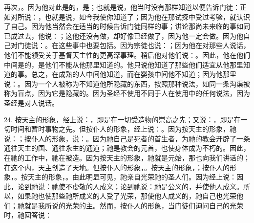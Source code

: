 再次，。因为他对此是的，是；也就是说，他当时没有那样知道以便告诉门徒：正如对所说：，也就是说，如今我使你知道了；因为他在那试探中受过考验，就认识了自己。因为他当然会在适当的时候告诉门徒同样的事；讲论那尚未来临的事如同已成过去，他说：；这他还没有做，却好像已经做了，因为他一定会做。因为他自己对门徒说：。在这些事中也要包括。因为宗徒也说：；因为他在对那些人说话，他们不能领受关于基督天主性的更高深事理。稍后他对他们说：。因此，他在他们中间是的，是他们不能从他那里知道的。他只说他知道了那些他们适宜从他那里知道的事。总之，在成熟的人中间他知道，而在婴孩中间他不知道；因为他那里说：。因为一个人被称为不知道他所隐藏的东西，按照那种说法，如同一条沟渠被称为盲点，因为它是隐藏的。因为圣经不使用不同于人在使用中的任何说法，因为圣经是对人说话。\par

24. 按天主的形象，经上说：，即是在一切受造物的崇高之先；又说：，即是在一切时间和暂时事物之先。但按仆人的形象，经上说：。因为按天主的形象，祂说：；按仆人的形象，说：。因为祂自己是死者的首生者，为祂的教会开辟了一条通往天主的国、通往永生的通道；祂是教会的元首，也使身体成为不朽的。因此，在祂的工作中，祂在被造。因为按天主的形象，祂就是元始，那也向我们讲话的；在这个内，天主创造了天地。但按仆人的形象，。按天主的形象，；按仆人的形象，。按天主的形象，。由此明显可见，祂亲自光荣祂的圣人们。因为经上说：因此，论到祂说：祂使不虔敬的人成义；论到祂说：祂是公义的，并使他人成义。所以，如果祂也使那些祂所成义的人受了光荣，那使他人成义的，祂自己也光荣他们；祂就是我所说的光荣的主。然而，按仆人的形象，当门徒们询问自己的光荣时，祂回答说：\par

